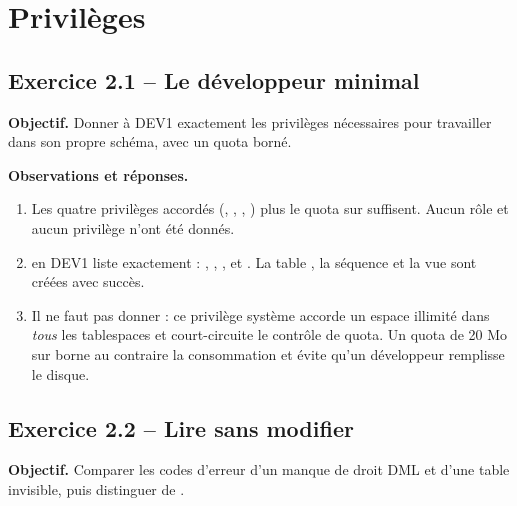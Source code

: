 \section{Privilèges}

\subsection{Exercice 2.1 -- Le développeur minimal}
\textbf{Objectif.} Donner à DEV1 exactement les privilèges nécessaires pour travailler dans son propre
schéma, avec un quota borné.


\textbf{Observations et réponses.}
\begin{enumerate}
  \item Les quatre privilèges accordés (, , ,
        ) plus le quota  sur  suffisent. Aucun rôle et aucun
        privilège  n'ont été donnés.
  \item {} en DEV1 liste exactement : , ,
        ,  et . La table , la
        séquence  et la vue  sont créées avec succès.
  \item Il ne faut pas donner  : ce privilège système accorde un espace
        illimité dans \emph{tous} les tablespaces et court-circuite le contrôle de quota. Un quota de 20 Mo
        sur  borne au contraire la consommation et évite qu'un développeur remplisse le disque.
\end{enumerate}

\subsection{Exercice 2.2 -- Lire sans modifier}
\textbf{Objectif.} Comparer les codes d'erreur d'un manque de droit DML et d'une table invisible, puis
distinguer  de .


